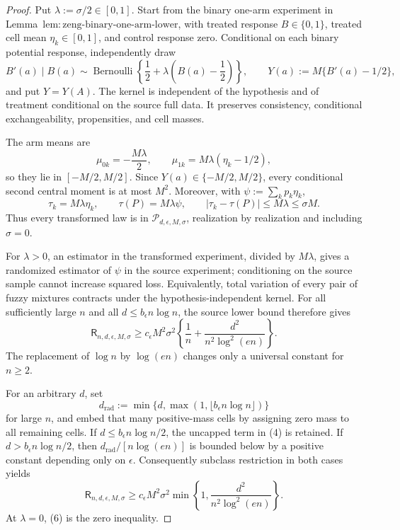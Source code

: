 \documentclass{article}
\begin{document}
\begin{proof}
Put \(\lambda:=\sigma/2\in[0,1]\).  Start from the binary one-arm experiment in Lemma~\(\mathrm{lem:zeng\text{-}binary\text{-}one\text{-}arm\text{-}lower}\), with treated response \(B\in\{0,1\}\), treated cell mean \(\eta_k\in[0,1]\), and control response zero.  Conditional on each binary potential response, independently draw
\[
 B'(a)\mid B(a)\sim\operatorname{Bernoulli}\!\left\{\frac12+\lambda\left(B(a)-\frac12\right)\right\},
 \qquad Y(a):=M\{B'(a)-1/2\},
\tag{1}
\]
and put \(Y=Y(A)\).  The kernel is independent of the hypothesis and of treatment conditional on the source full data.  It preserves consistency, conditional exchangeability, propensities, and cell masses.

The arm means are
\[
 \mu_{0k}=-\frac{M\lambda}{2},
 \qquad \mu_{1k}=M\lambda(\eta_k-1/2),
\tag{2}
\]
so they lie in \([-M/2,M/2]\).  Since \(Y(a)\in\{-M/2,M/2\}\), every conditional second central moment is at most \(M^2\).  Moreover, with \(\psi:=\sum_kp_k\eta_k\),
\[
 \tau_k=M\lambda\eta_k,
 \qquad \tau(P)=M\lambda\psi,
 \qquad |\tau_k-\tau(P)|
 \le M\lambda\le\sigma M.
\tag{3}
\]
Thus every transformed law is in \(\mathcal P_{d,\epsilon,M,\sigma}\), realization by realization and including \(\sigma=0\).

For \(\lambda>0\), an estimator in the transformed experiment, divided by \(M\lambda\), gives a randomized estimator of \(\psi\) in the source experiment; conditioning on the source sample cannot increase squared loss.  Equivalently, total variation of every pair of fuzzy mixtures contracts under the hypothesis-independent kernel.  For all sufficiently large \(n\) and all \(d\le b_{\epsilon}n\log n\), the source lower bound therefore gives
\[
 \mathsf R_{n,d,\epsilon,M,\sigma}
 \ge c_{\epsilon}M^2\sigma^2
 \left\{\frac1n+\frac{d^2}{n^2\log^2(en)}\right\}.
\tag{4}
\]
The replacement of \(\log n\) by \(\log(en)\) changes only a universal constant for \(n\ge2\).

For an arbitrary \(d\), set
\[
 d_{\mathrm{rad}}:=\min\{d,\max(1,\lfloor b_{\epsilon}n\log n\rfloor)\}
\tag{5}
\]
for large \(n\), and embed that many positive-mass cells by assigning zero mass to all remaining cells.  If \(d\le b_{\epsilon}n\log n/2\), the uncapped term in (4) is retained.  If \(d>b_{\epsilon}n\log n/2\), then \(d_{\mathrm{rad}}/[n\log(en)]\) is bounded below by a positive constant depending only on \(\epsilon\).  Consequently subclass restriction in both cases yields
\[
 \mathsf R_{n,d,\epsilon,M,\sigma}
 \ge c_{\epsilon}M^2\sigma^2
 \min\left\{1,\frac{d^2}{n^2\log^2(en)}\right\}.
\tag{6}
\]
At \(\lambda=0\), (6) is the zero inequality.


\end{proof}
\end{document}
